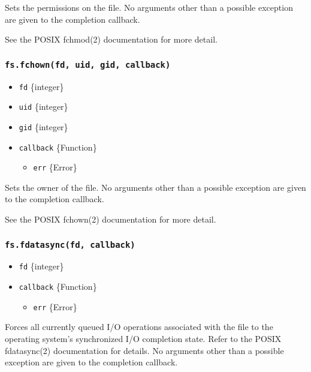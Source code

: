 Sets the permissions on the file. No arguments other than a possible
exception are given to the completion callback.

See the POSIX fchmod(2) documentation for more detail.

\subsubsection{\texorpdfstring{\texttt{fs.fchown(fd,\ uid,\ gid,\ callback)}}{fs.fchown(fd, uid, gid, callback)}}\label{fs.fchownfd-uid-gid-callback}

\begin{itemize}
\tightlist
\item
  \texttt{fd} \{integer\}
\item
  \texttt{uid} \{integer\}
\item
  \texttt{gid} \{integer\}
\item
  \texttt{callback} \{Function\}

  \begin{itemize}
  \tightlist
  \item
    \texttt{err} \{Error\}
  \end{itemize}
\end{itemize}

Sets the owner of the file. No arguments other than a possible exception
are given to the completion callback.

See the POSIX fchown(2) documentation for more detail.

\subsubsection{\texorpdfstring{\texttt{fs.fdatasync(fd,\ callback)}}{fs.fdatasync(fd, callback)}}\label{fs.fdatasyncfd-callback}

\begin{itemize}
\tightlist
\item
  \texttt{fd} \{integer\}
\item
  \texttt{callback} \{Function\}

  \begin{itemize}
  \tightlist
  \item
    \texttt{err} \{Error\}
  \end{itemize}
\end{itemize}

Forces all currently queued I/O operations associated with the file to
the operating system's synchronized I/O completion state. Refer to the
POSIX fdatasync(2) documentation for details. No arguments other than a
possible exception are given to the completion callback.

